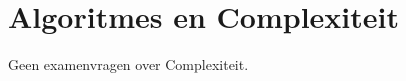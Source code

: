 \section{Algoritmes en Complexiteit} \label{sec:algoritmes_en_complexiteit}
Geen examenvragen over Complexiteit.
